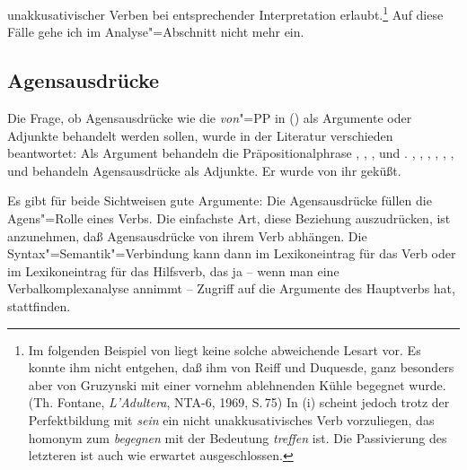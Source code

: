 unakkusativischer Verben bei entsprechender Interpretation erlaubt.\footnote{
        Im folgenden Beispiel von \citet[]{Faucher87}
        liegt keine solche abweichende Lesart vor.
        \ea
        Es konnte ihm nicht entgehen, daß ihm von Reiff und Duquesde,
        ganz besonders aber von Gruzynski mit einer vornehm
        ablehnenden Kühle begegnet wurde. (Th. Fontane, {\em L'Adultera},
        NTA-6, 1969, S.\,75)
        \z
        In (i) scheint jedoch trotz der Perfektbildung mit \emph{sein}
        ein nicht unakkusativisches Verb vorzuliegen, das homonym zum \emph{begegnen}
        mit der Bedeutung \emph{treffen} ist. Die Passivierung des letzteren
        ist auch wie erwartet ausgeschlossen.
        \eal
        \zllast
}
Auf  diese Fälle gehe ich im Analyse"=Abschnitt nicht mehr ein.


\subsection{Agensausdrücke}

Die Frage, ob Agensausdrücke wie die \emph{von}"=PP in () als Argumente oder Adjunkte behandelt werden sollen,
wurde in der Literatur verschieden beantwortet: Als Argument behandeln 
die Präpositionalphrase \zb 
\citet[]{Heringer73a}, 
\citet{Bresnan82a},
\citet{ps}, 
\citet{MS98a} und
\citet[Kapitel~15.3]{Mueller99a}.
%
\citet[]{Hoehle78a}, \citet{Sadzinski87a}, \citet[]{Stechow90a}, 
\citet[]{Zifonun92a}, 
\citet[]{Lieb92a},
\citet[]{Wunderlich93a}, 
\citet{Mueller2003e} und 
\citet[]{Gunkel2003b} 
behandeln Agensausdrücke als Adjunkte.
\ea
Er wurde von ihr geküßt.
\z

\noindent
Es gibt für beide Sichtweisen gute Argumente: Die Agensausdrücke füllen die Agens"=Rolle
eines Verbs. Die einfachste Art, diese Beziehung auszudrücken, ist anzunehmen, daß Agensausdrücke
von ihrem Verb abhängen. Die Syntax"=Semantik"=Verbindung kann dann im Lexikoneintrag für das
Verb oder im Lexikoneintrag für das Hilfsverb, das ja -- wenn man eine Verbalkomplexanalyse annimmt --
Zugriff auf die Argumente des Hauptverbs hat, stattfinden.

